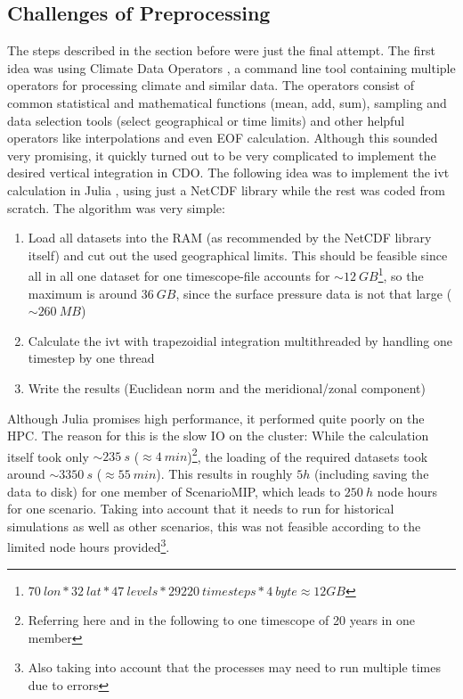 \subsection{Challenges of Preprocessing}
\label{sec:preprocessing challanges}

The steps described in the section before were just the final attempt. 
The first idea was using Climate Data Operators \cite{schulzweida2024}, a command line tool containing multiple operators for processing climate and similar data. 
The operators consist of common statistical and mathematical functions (mean, add, sum), sampling and data selection tools (select geographical or time limits) and other helpful operators like interpolations and even EOF calculation. 
Although this sounded very promising, it quickly turned out to be very complicated to implement the desired vertical integration in CDO.
The following idea was to implement the \ac{ivt} calculation in Julia \cite{gao_julia_2020}, using just a NetCDF library \cite{barth_ncdatasetsjl_2024} while the rest was coded from scratch. 
The algorithm was very simple: 

\begin{enumerate}[itemsep=0mm]
  \item Load all datasets into the RAM (as recommended by the NetCDF library itself) and cut out the used geographical limits. This should be feasible since all in all one dataset for one timescope-file accounts for $\sim 12~GB$\footnote{$70~lon * 32~lat * 47~levels * 29220~timesteps * 4~byte \approx 12 GB$}, so the maximum is around $36~GB$, since the surface pressure data is not that large ($\sim 260~MB$)   
  \item Calculate the \ac{ivt} with trapezoidial integration multithreaded by handling one time\-step by one thread
  \item Write the results (Euclidean norm and the meridional/zonal component)
\end{enumerate}

Although Julia promises high performance, it performed quite poorly on the HPC.
The reason for this is the slow IO on the cluster: While the calculation itself took only $\sim 235~s$ ($\approx 4~min$)\footnote{Referring here and  in the following to one timescope of 20 years in one member}, the loading of the required datasets took around $\sim 3350~s$ ($\approx 55~min$). 
This results in roughly $5 h$ (including saving the data to disk) for one member of ScenarioMIP, which leads to $250~h$ node hours for one scenario. 
Taking into account that it needs to run for historical simulations as well as other scenarios, this was not feasible according to the limited node hours provided\footnote{Also taking into account that the processes may need to run multiple times due to errors}.

